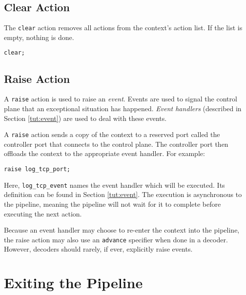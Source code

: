 \subsection{Clear Action} \label{tut:clear_action}

The \texttt{clear} action removes all actions from the context's action list. If the list is empty, nothing is done.

\begin{codepage}
\begin{lstlisting}
clear;
\end{lstlisting}
\end{codepage}

\subsection{Raise Action} \label{tut:raise_action}

A \texttt{raise} action is used to raise an \textit{event}. Events are used to
signal the control plane that an exceptional situation has happened.
\textit{Event handlers} (described in Section \ref{tut:event}) are used to
deal with these events.

A \texttt{raise} action sends a copy of the context to a reserved port called the controller port that connects to the control plane.
The controller port then offloads the context to the appropriate event handler.
For example:

\begin{codepage}
\begin{lstlisting}
raise log_tcp_port;
\end{lstlisting}
\end{codepage}


Here, \texttt{log\_tcp\_event} names the event handler which will be executed. Its definition can be found in Section \ref{tut:event}. The execution is asynchronous to the pipeline, meaning the pipeline will not wait for it to complete before executing the next action.

Because an event handler may choose to re-enter the context into the pipeline, the raise action may also use an \texttt{advance} specifier when done in a decoder. However, decoders should rarely, if ever, explicitly raise events.

\section{Exiting the Pipeline} \label{tut:pipeline_exit}


